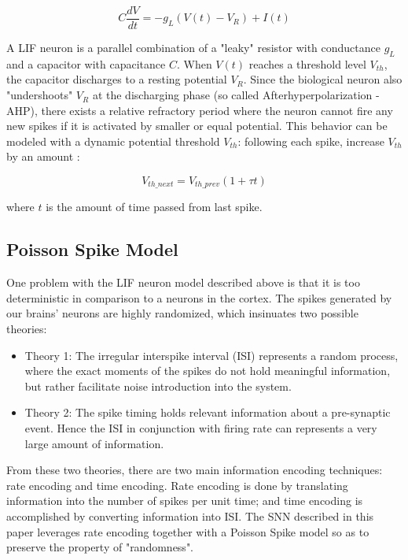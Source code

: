 \documentclass[11pt]{article}  %
\begin{document}
\begin{equation}
	C\frac{dV}{dt} = -g_L(V(t) - V_R) + I(t)
	\label{eq1}
\end{equation}

A LIF neuron is a parallel combination of a "leaky" resistor with conductance $g_L$ and a capacitor with capacitance $C$. When $V(t)$ reaches a threshold level $V_{th}$, the capacitor discharges to a resting potential $V_R$. Since the biological neuron also "undershoots" $V_R$ at the discharging phase (so called Afterhyperpolarization - AHP), there exists a relative refractory period where the neuron cannot fire any new spikes if it is activated by smaller or equal potential. This behavior can be modeled with a dynamic potential threshold $V_{th}$: following each spike, increase $V_{th}$ by an amount \cite{b6}:

\begin{equation}
	V_{th\_next} = V_{th\_prev}(1+\tau t)
	\label{eq2}
\end{equation}

where $t$ is the amount of time passed from last spike. 

\subsection{Poisson Spike Model}

One problem with the LIF neuron model described above is that it is too deterministic in comparison to a neurons in the cortex. The spikes generated by our brains' neurons are highly randomized, which insinuates two possible theories:

\begin{itemize}
	\item Theory 1: The irregular interspike interval (ISI) represents a random process, where the exact moments of the spikes do not hold meaningful information, but rather facilitate noise introduction into the system.
	\item Theory 2: The spike timing holds relevant information about a pre-synaptic event. Hence the ISI in conjunction with firing rate can represents a very large amount of information.
\end{itemize}

From these two theories, there are two main information encoding techniques: rate encoding and time encoding. Rate encoding is done by translating information into the number of spikes per unit time; and time encoding is accomplished by converting information into ISI. The SNN described in this paper leverages rate encoding together with a Poisson Spike model so as to preserve the property of "randomness".
\end{document}
